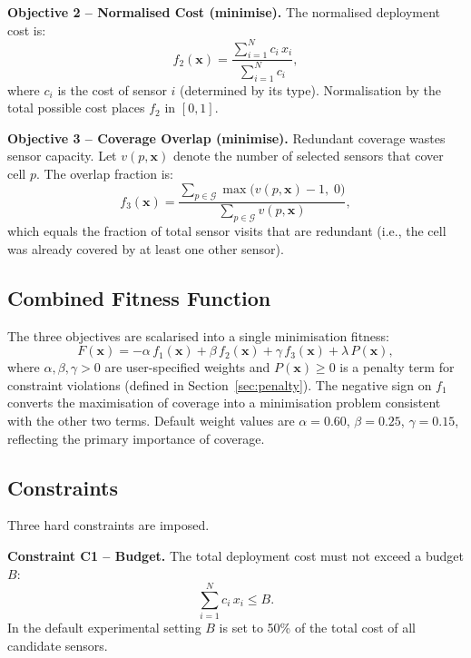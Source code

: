 \documentclass[12pt,a4paper]{article}
\begin{document}
\textbf{Objective 2 -- Normalised Cost (minimise).}
The normalised deployment cost is:
\begin{equation}
  f_2(\mathbf{x}) = \frac{\displaystyle\sum_{i=1}^{N} c_i\, x_i}{\displaystyle\sum_{i=1}^{N} c_i},
  \label{eq:f2}
\end{equation}
where $c_i$ is the cost of sensor $i$ (determined by its type).
Normalisation by the total possible cost places $f_2$ in $[0, 1]$.

\textbf{Objective 3 -- Coverage Overlap (minimise).}
Redundant coverage wastes sensor capacity.
Let $v(p, \mathbf{x})$ denote the number of selected sensors that cover cell $p$.
The overlap fraction is:
\begin{equation}
  f_3(\mathbf{x}) = \frac{\displaystyle\sum_{p \in \mathcal{G}} \max\!\bigl(v(p,\mathbf{x}) - 1,\; 0\bigr)}
                        {\displaystyle\sum_{p \in \mathcal{G}} v(p,\mathbf{x})},
  \label{eq:f3}
\end{equation}
which equals the fraction of total sensor visits that are redundant (i.e., the cell was already covered by at least one other sensor).

\subsection{Combined Fitness Function}

The three objectives are scalarised into a single minimisation fitness:
\begin{equation}
  F(\mathbf{x}) = -\alpha\, f_1(\mathbf{x}) + \beta\, f_2(\mathbf{x}) + \gamma\, f_3(\mathbf{x}) + \lambda\, P(\mathbf{x}),
  \label{eq:fitness}
\end{equation}
where $\alpha, \beta, \gamma > 0$ are user-specified weights and $P(\mathbf{x}) \geq 0$ is a penalty term for constraint violations (defined in Section~\ref{sec:penalty}).
The negative sign on $f_1$ converts the maximisation of coverage into a minimisation problem consistent with the other two terms.
Default weight values are $\alpha = 0.60$, $\beta = 0.25$, $\gamma = 0.15$, reflecting the primary importance of coverage.

\subsection{Constraints}
\label{sec:constraints}

Three hard constraints are imposed.

\textbf{Constraint C1 -- Budget.}
The total deployment cost must not exceed a budget $B$:
\begin{equation}
  \sum_{i=1}^{N} c_i\, x_i \leq B.
  \label{eq:c1}
\end{equation}
In the default experimental setting $B$ is set to 50\% of the total cost of all candidate sensors.
\end{document}
